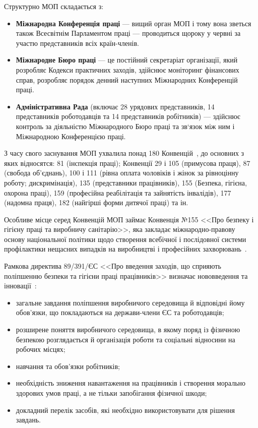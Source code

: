 Структурно МОП складається з:
\begin{itemize}
	\item \textbf{Міжнародна Конференція праці} --- вищий орган МОП і тому вона зветься також Всесвітнім Парламентом праці --- проводиться щороку у червні за участю представників всіх країн-членів.
	\item \textbf{Міжнародне Бюро праці} --- це постійний секретаріат організації, який розробляє Кодекси практичних заходів, здійснює моніторинг фінансових справ, розробляє порядок денний наступних Міжнародних Конференцій праці.
	\item \textbf{Адміністративна Рада} (включає 28 урядових представників, 14 представників роботодавців та 14 представників робітників) --- здійснює контроль за діяльністю Міжнародного Бюро праці та зв‘язок між ним і Міжнародною Конференцією праці.
\end{itemize}

З часу свого заснування МОП ухвалила понад 180 Конвенцій~\cite{LectureKPI}, до основних з яких відносятся: 81 (інспекція праці); Конвенції 29 і 105 (примусова праця), 87 (свобода об'єднань), 100 і 111 (рівна оплата чоловіків і жінок за рівноцінну роботу; дискримінація), 135 (представники працівників), 155 (Безпека, гігієна, охорона праці), 159 (професійна реабілітація та зайнятість інвалідів), 177 (надомна праця), 182 (найгірші форми дитячої праці) та ін.

Особливе місце серед Конвенцій МОП займає Конвенція №155 <<Про безпеку і гігієну праці та виробничу санітарію>>, яка закладає міжнародно-правову основу національної політики щодо створення всебічної і послідовної системи профілактики нещасних випадків на виробництві і професійних захворювань~\cite{LectureKPI}.

Рамкова директива 89/391/ЄС <<Про введення заходів, що сприяють поліпшенню безпеки та гігієни праці працівників>> визначає нововведення та інновації~\cite{LectureOdessa}:
\begin{itemize}
	\item загальне завдання поліпшення виробничого середовища й відповідні йому обов’язки, що покладаються на держави-члени ЄС та роботодавців;
	\item розширене поняття виробничого середовища, в якому поряд із фізичною безпекою розглядається й організація роботи та соціальні відносини на робочих місцях;
	\item навчання та обов’язки робітників;
	\item необхідність зниження навантаження на працівників і створення морально здорових умов праці, а не тільки запобігання фізичної шкоди;
	\item докладний перелік засобів, які необхідно використовувати для рішення завдань.
\end{itemize}

